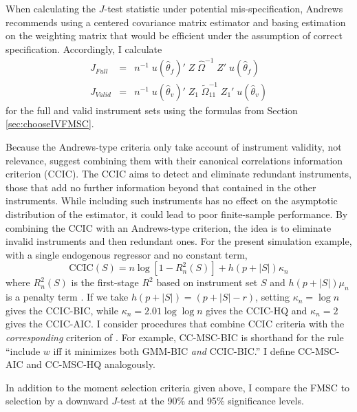 When calculating the $J$-test statistic under potential mis-specification, Andrews recommends using a centered covariance matrix estimator and basing estimation on the weighting matrix that would be efficient under the assumption of correct specification. 
Accordingly, I calculate
	\begin{eqnarray}
		J_{Full} &=&n^{-1}\; u( \widehat{\theta}_{f})'\;Z \; \widehat{\Omega}^{-1} \;Z' \;u( \widehat{\theta}_{f})\\
		J_{Valid} &=&n^{-1}\; u( \widehat{\theta}_{v})'\;Z_1 \;\widetilde{\Omega}_{11}^{-1} \;Z_1'\;u( \widehat{\theta}_{v})
	\end{eqnarray}
for the full and valid instrument sets using the formulas from Section \ref{sec:chooseIVFMSC}. 

Because the Andrews-type criteria only take account of instrument validity, not relevance, \cite{HallPeixe2003} suggest combining them with their canonical correlations information criterion (CCIC). 
The CCIC aims to detect and eliminate redundant instruments, those that add no further information beyond that contained in the other instruments. 
While including such instruments has no effect on the asymptotic distribution of the estimator, it could lead to poor finite-sample performance. 
By combining the CCIC with an Andrews-type criterion, the idea is to eliminate invalid instruments and then redundant ones. 
For the present simulation example, with a single endogenous regressor and no constant term, 
	\begin{equation}
	\mbox{CCIC}(S) = n \log\left[1 - R_n^2(S) \right] + h(p + |S|)\kappa_n
	\end{equation}
where $R_n^2(S)$ is the first-stage $R^2$ based on instrument set $S$ and $h(p + |S|)\mu_n$ is a penalty term \citep{Jana2005}. 
If we take $h(p + |S|) = (p + |S| - r)$, setting $\kappa_n = \log{n}$ gives the CCIC-BIC, while $\kappa_n = 2.01 \log{\log{n}}$ gives the CCIC-HQ  and $\kappa_n = 2$ gives the CCIC-AIC. 
I consider procedures that combine CCIC criteria with the \emph{corresponding} criterion of \cite{Andrews1999}. 
For example, CC-MSC-BIC is shorthand for the rule ``include $w$ iff it minimizes both  GMM-BIC \emph{and} CCIC-BIC.'' 
I define CC-MSC-AIC and CC-MSC-HQ analogously.


In addition to the moment selection criteria given above, I compare the FMSC to selection by a downward $J$-test at the 90\% and 95\% significance levels. 


